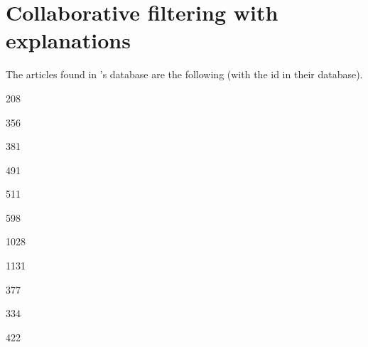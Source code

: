 \documentclass[version=3.21, pagesize, twoside=off, bibliography=totoc, DIV=calc, fontsize=12pt, a4paper, french, english]{scrartcl}
\begin{document}
\section{Collaborative filtering with explanations}
The articles found in \citet{nunes_systematic_2017}’s database are the following (with the id in their database).
\begin{description}
	\item[208]  \citet{cleger-tamayo_explaining_2012}
	\item[356]  \citet{gedikli_understanding_2011}
	\item[381]  \citet{gedikli_how_2014}
	\item[491]  \citet{gkika_investigating_2014}
	\item[511]  \citet{guy_personalized_2009}
	\item[598]  \citet{herlocker_explaining_2000}
	\item[1028]  \citet{hu_collaborative_2008}
	\item[1131]  \citet{marx_increasing_2010}
	\item[377]  \citet{odonovan_visual_2009}
	\item[334]  \citet{symeonidis_providing_2008}
	\item[422]  \citet{yu_it_2009}
\end{description}
\end{document}
